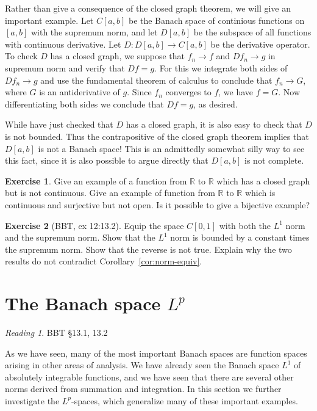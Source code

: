 \documentclass[11pt,oneside]{amsbook}
\newcommand{\RR}{{\mathbb R}}
\theoremstyle{definition}
\newtheorem{exerc}{Exercise}[section]
\theoremstyle{plain}
\theoremstyle{definition}
\theoremstyle{remark}
\newtheorem*{reading}{Reading}
\numberwithin{equation}{section}
\numberwithin{figure}{section}
\begin{document}
Rather than give a consequence of the closed graph theorem, we will give an important example. Let $C[a,b]$ be the Banach space of continious functions on $[a,b]$ with the supremum norm, and let $D[a,b]$ be the subspace of all functions with continuous derivative. Let $D\colon D[a,b]\to C[a,b]$ be the derivative operator. To check $D$ has a closed graph, we suppose that $f_n\to f$ and $Df_n\to g$ in supremum norm and verify that $Df=g$. For this we integrate both sides of $Df_n\to g$ and use the fundamental theorem of calculus to conclude that $f_n\to G$, where $G$ is an antiderivative of $g$. Since $f_n$ converges to $f$, we have $f=G$. Now differentiating both sides we conclude that $Df=g$, as desired.

While have just checked that $D$ has a closed graph, it is also easy to check that $D$ is not bounded. Thus the contrapositive of the closed graph theorem implies that $D[a,b]$ is not a Banach space! This is an admittedly somewhat silly way to see this fact, since it is also possible to argue directly that $D[a,b]$ is not complete.

\begin{exerc}
  Give an example of a function from $\RR$ to $\RR$ which has a closed graph but is not continuous. Give an example of function from $\RR$ to $\RR$ which is continuous and surjective but not open. Is it possible to give a bijective example?
\end{exerc}

\begin{exerc}[BBT, ex 12:13.2]
  Equip the space $C[0,1]$ with both the $L^1$ norm and the supremum norm. Show that the $L^1$ norm is bounded by a constant times the supremum norm. Show that the reverse is not true. Explain why the two results do not contradict Corollary~\ref{cor:norm-equiv}.
\end{exerc}


\newpage
\section{The Banach space $L^p$}

\begin{reading}
  BBT \S 13.1, 13.2
\end{reading}

As we have seen, many of the most important Banach spaces are function spaces arising in other areas of analysis. We have already seen the Banach space $L^1$ of absolutely integrable functions, and we have seen that there are several other norms derived from summation and integration. In this section we further investigate the $L^p$-spaces, which generalize many of these important examples.
\end{document}
